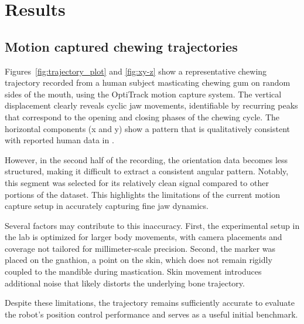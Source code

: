 \section{Results}
\subsection{Motion captured chewing trajectories}

Figures~\ref{fig:trajectory_plot} and \ref{fig:xy-z} show a representative chewing trajectory recorded from a human subject masticating chewing gum on random sides of the mouth, using the OptiTrack motion 
capture system. The vertical displacement clearly reveals cyclic jaw movements, identifiable by recurring peaks that correspond to the opening and closing 
phases of the chewing cycle. The horizontal components (x and y) show a pattern that is qualitatively consistent with reported human data in \cite{chewing_traj}.

However, in the second half of the recording, the orientation data becomes less structured, making it difficult to extract a consistent angular pattern. Notably, 
this segment was selected for its relatively clean signal compared to other portions of the dataset. This highlights the limitations of the current motion capture 
setup in accurately capturing fine jaw dynamics.

Several factors may contribute to this inaccuracy. First, the experimental setup in the lab is optimized for larger body movements, with camera placements and 
coverage not tailored for millimeter-scale precision. Second, the marker was placed on the gnathion, a point on the skin, which does not remain rigidly coupled 
to the mandible during mastication. Skin movement introduces additional noise that likely distorts the underlying bone trajectory.

Despite these limitations, the trajectory remains sufficiently accurate to evaluate the robot's position control performance and serves as a useful initial 
benchmark.

